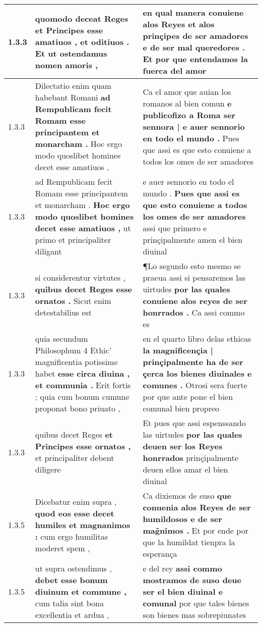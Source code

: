 \begin{tabular}{|p{1cm}|p{6.5cm}|p{6.5cm}|}
1.3.3 & quomodo deceat Reges \textbf{ et Principes esse amatiuos , et oditiuos . } Et ut ostendamus nomen amoris , & en qual manera conuiene alos Reyes \textbf{ et alos prinçipes de ser amadores e de ser mal queredores . } Et por que entendamos la fuerca del amor \\\hline
1.3.3 & Dilectatio enim quam habebant Romani \textbf{ ad Rempublicam fecit Romam esse principantem et monarcham . } Hoc ergo modo quoslibet homines decet esse amatiuos , & Ca el amor que auian los romanos al bien comun \textbf{ e publicofizo a Roma ser sennora | e auer sennorio en todo el mundo . } Pues que assi es que esto conuiene a todos los omes de ser amadores \\\hline
1.3.3 & ad Rempublicam fecit Romam esse principantem et monarcham . \textbf{ Hoc ergo modo quoslibet homines decet esse amatiuos , } ut primo et principaliter diligant & e auer sennorio en todo el mundo . \textbf{ Pues que assi es que esto conuiene a todos los omes de ser amadores } assi que primero e prinçipalmente amen el bien diuinal \\\hline
1.3.3 & si considerentur virtutes , \textbf{ quibus decet Reges esse ornatos . } Sicut enim detestabilius est & ¶Lo segundo esto mesmo se praeua assi si pensaremos las uirtudes \textbf{ por las quales conuiene alos reyes de ser honrrados . } Ca assi commo es \\\hline
1.3.3 & quia secundum Philosophum 4 Ethic’ magnificentia potissime habet \textbf{ esse circa diuina , et communia . } Erit fortis ; quia cum bonum cumune proponat bono priuato , & en el quarto libro delas ethicas \textbf{ la magnificençia | prinçipalmente ha de ser çerca los bienes diuinales e comunes . } Otrosi sera fuerte por que ante pone el bien comunal bien propreo \\\hline
1.3.3 & quibus decet Reges \textbf{ et Principes esse ornatos , } et principaliter debent diligere & Et pues que assi espenssando las uirtudes \textbf{ por las quales deuen ser los Reyes honrrados } prinçipalmente deuen ellos amar el bien diuinal \\\hline
1.3.5 & Dicebatur enim supra , \textbf{ quod eos esse decet humiles et magnanimos : } cum ergo humilitas moderet spem , & Ca dixiemos de suso \textbf{ que conuenia alos Reyes de ser humildosos e de ser mag̃nimos . } Et por ende por que la humildat tienpra la esperança \\\hline
1.3.5 & ut supra ostendimus , \textbf{ debet esse bonum diuinum et commune , } cum talia sint bona excellentia et ardua , & e del rey \textbf{ assi commo mostramos de suso deue ser el bien diuinal e comunal } por que tales bienes son bienes mas sobrepiunates \\\hline

\end{tabular}
